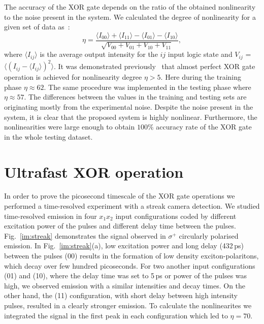 \documentclass[
 print,
 amsmath,amssymb,
 aps,
]{revtex4-2}
\begin{document}
	The accuracy of the XOR gate depends on the ratio of the obtained nonlinearity to the noise present in the system. We calculated the degree of nonlinearity for a given set of data as~\cite{Mirek_XOR}:
	\begin{equation}
	\eta = \frac{\langle I_{00}\rangle + \langle I_{11}\rangle - \langle I_{01}\rangle - \langle I_{10}\rangle}{\sqrt{V_{00}+V_{01}+V_{10}+V_{11}}},
	\end{equation}
	where $\langle I_{ij}\rangle$ is the average output intensity for the $ij$ input logic state and $V_{ij}$ = $\langle\left( I_{ij} - \langle I_{ij}\rangle\right)^2\rangle$. It was demonstrated previously~\cite{Mirek_XOR} that almost perfect XOR gate operation is achieved for nonlinearity degree  $\eta > 5$. Here during the training phase $\eta\approx 62$. The same procedure was implemented in the testing phase where $\eta\approx57$. The differences between the values in the training and testing sets are originating mostly from the experimental noise. Despite the noise present in the system, it is clear that the proposed system is highly nonlinear. Furthermore, the nonlinearities were large enough to obtain $100\%$ accuracy rate of the XOR gate in the whole testing dataset.
	
	\section{\label{sec:Ultrafast}Ultrafast XOR operation}

	In order to prove the picosecond timescale of the XOR gate operations we performed a time-resolved experiment with a streak camera detection. We studied time-resolved emission in four $x_1x_2$ input configurations coded by different excitation power of the pulses and different delay time between the pulses. Fig.~\ref{im:streak} demonstrates the signal observed in $\sigma^+$ circularly polarised emission. In Fig.~\ref{im:streak}(a), low excitation power and long delay (432\,ps) between the pulses (00) results in the formation of low density exciton-polaritons, which decay over few hundred picoseconds. For two another input configurations (01) and (10), where the delay time was set to 5\,ps or power of the pulses was high, we observed emission with a similar intensities and decay times. On the other hand, the (11) configuration, with short delay between high intensity pulses, resulted in a clearly stronger emission. To calculate the nonlinearites we integrated the signal in the first peak in each configuration which led to $\eta = 70$.
	
\end{document}
